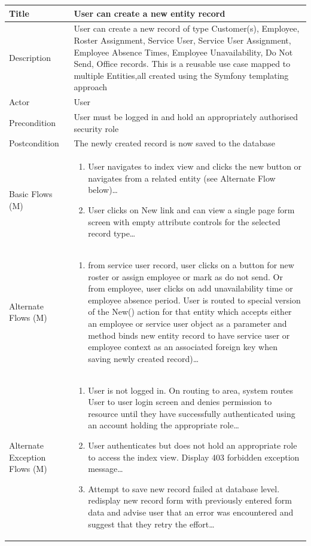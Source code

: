 \documentclass[a4paper,12pt]{article}
\newcommand\addrow[2]{#1 &#2\\ }
\newcommand\addheading[2]{#1 &#2\\ \hline}
\newcommand\tabularhead{\begin{tabular}{lp{8cm}}
\hline
}
\newcommand\addmulrow[2]{ \begin{minipage}[t][][t]{2.5cm}#1\end{minipage}%
   &\begin{minipage}[t][][t]{8cm}
    \begin{enumerate} #2   \end{enumerate}
    \end{minipage}\\ }
\newenvironment{usecase}{\tabularhead}
{\hline\end{tabular}}
\begin{document}
\begin{samepage}
\begin{usecase}
    \addheading{Title}{User can create a new entity record }
  \addheading{Description}{User can create a new record of type Customer(s), Employee, Roster Assignment, Service User, Service User Assignment, Employee Absence Times, Employee Unavailability, Do Not Send, Office records. This is a reusable use case mapped to multiple Entities,all created using the Symfony templating approach}
  \addheading{Actor}{User} 
  \addrow{Precondition}{User must be logged in and hold an appropriately authorised security role}
  \addrow{Postcondition}{The newly created record is now saved to the database}
  \addmulrow{Basic Flows (M)}{\item User navigates to index view and clicks the new button or navigates from a related entity (see Alternate Flow below)\ldots
                                  \item User clicks on New link and can view a single page form screen with empty attribute controls for the selected record type\ldots}
  \addmulrow{Alternate  Flows (M)}{\item from service user record, user clicks on a button for new roster or assign employee or mark as do not send. Or from employee, user clicks on add unavailability time or employee absence period. User is routed to special version of the New() action for that entity which accepts either an employee or service user object as a parameter and method binds new entity record to have service user or employee context as an associated foreign key when saving newly created record)\ldots}
  \addmulrow{Alternate Exception Flows (M)}{\item User is not logged in. On routing to area, system routes User to user login screen and denies permission to resource until they have successfully authenticated using an account holding the appropriate role\ldots
                                                                      \item User authenticates but does not hold an appropriate role to access the index view. Display 403 forbidden exception message\ldots
                                                                      \item Attempt to save new record failed at database level. redisplay new record form with previously entered form data and advise user that an error was encountered and suggest that they retry the effort\ldots}

\end{usecase}


\end{samepage}
\end{document}
